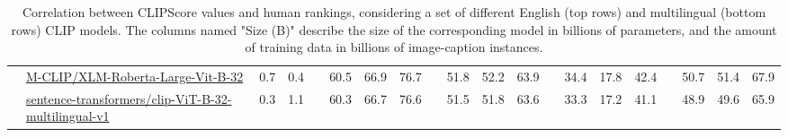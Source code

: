\begin{table*}[t!]
{\begin{tabular}{c l c c c c c c c c c c c c c c c c c c}
\multicolumn{1}{l}{}&\href{https://huggingface.co/M-CLIP/XLM-Roberta-Large-Vit-B-32}{M-CLIP/XLM-Roberta-Large-Vit-B-32}           & 0.7 & 0.4      &  & 60.5 & 66.9 & 76.7 & & 51.8 & 52.2 & 63.9 & & 34.4 & 17.8 & 42.4 & & 50.7 & 51.4 & 67.9 \\
\multicolumn{1}{l}{}&\href{https://huggingface.co/sentence-transformers/clip-ViT-B-32-multilingual-v1}{sentence-transformers/clip-ViT-B-32-multilingual-v1} & 0.3 & 1.1 && 60.3 & 66.7 & 76.6 & & 51.5 & 51.8 & 63.6 & & 33.3 & 17.2 & 41.1 & & 48.9 & 49.6 & 65.9 \\ \hline
\end{tabular}
}
\vspace{-0.25cm}
\caption{Correlation between CLIPScore values and human rankings, considering a set of different English (top rows) and multilingual (bottom rows) CLIP models. The columns named "Size (B)" describe the size of the corresponding model in billions of parameters, and the amount of training data in billions of image-caption instances.}
\label{tab:english-only-corr}
\vspace{-0.25cm}
\end{table*}